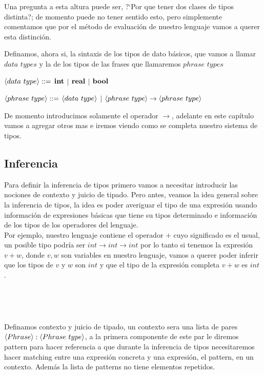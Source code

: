 Una pregunta a esta altura puede ser, ?`Por que tener dos clases de tipos 
distinta?; de momento puede no tener sentido esto, pero simplemente
comentamos que por el m\'etodo de evaluaci\'on de nuestro lenguaje
vamos a querer esta distinci\'on.\

Definamos, ahora si, la sintaxis de los tipos de dato b\'asicos, 
que vamos a llamar $data$ $types$ y la de los tipos de las frases que
llamaremos $phrase$ $types$ 

\begin{center} $\langle data \ type \rangle ::=$ $\textbf{int}$ $|$ $\textbf{real}$ $|$ $\textbf{bool}$ \end{center}

\begin{center} 
$\langle phrase \ type \rangle::=$ $\langle data \ type \rangle$ 
$|$ $\langle phrase \ type \rangle \rightarrow \langle phrase \ type \rangle$
\end{center}

De momento introducimos solamente el operador $\rightarrow$, adelante en este 
cap\'itulo vamos a agregar otros mas e iremos viendo como se completa nuestro
sistema de tipos.\

\subsection{Inferencia}
Para definir la inferencia de tipos primero vamos a necesitar introducir las 
nociones de contexto y juicio de tipado. Pero antes, veamos la idea general
sobre la inferencia de tipos, la idea es poder averiguar el tipo de una expresi\'on
usando informaci\'on de expresiones b\'asicas que tiene su tipos determinado e
informaci\'on de los tipos de los operadores del lenguaje.\\
Por ejemplo, nuestro lenguaje contiene el operador $+$ cuyo significado
es el usual, un posible tipo podr\'ia ser $int \rightarrow int \rightarrow int$
por lo tanto si tenemos la expresi\'on $v + w$, donde $v,w$ son variables en
nuestro lenguaje, vamos a querer poder inferir que los tipos de $v$ y $w$ son
$int$ y que el tipo de la expresi\'on completa $v + w$ es $int$.\

\

\

\noindent Definamos contexto y juicio de tipado, un contexto sera una lista de 
pares $\lrangles{Phrase}:\lrangles{Phrase \ type}$, a la primera componente de este 
par le diremos pattern para hacer referencia a que durante la inferencia de tipos
necesitaremos hacer matching entre una expresi\'on concreta y una expresi\'on, el
pattern, en un contexto. Adem\'as la lista de patterns no tiene elementos repetidos.

